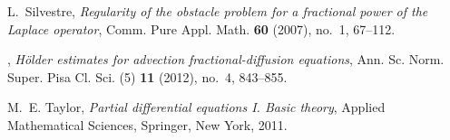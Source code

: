 \documentclass[11pt,reqno]{amsart}
\theoremstyle{definition}
\theoremstyle{remark}
\begin{document}
\begin{thebibliography}{10}
L.~Silvestre, \emph{Regularity of the obstacle problem for a fractional power
  of the {L}aplace operator}, Comm. Pure Appl. Math. \textbf{60} (2007), no.~1,
  67--112.

\bysame, \emph{H\"older estimates for advection fractional-diffusion
  equations}, Ann. Sc. Norm. Super. Pisa Cl. Sci. (5) \textbf{11} (2012),
  no.~4, 843--855.

M.~E. Taylor, \emph{Partial differential equations {I}. {B}asic theory},
  Applied Mathematical Sciences, Springer, New York, 2011.

\end{thebibliography}
\end{document}
